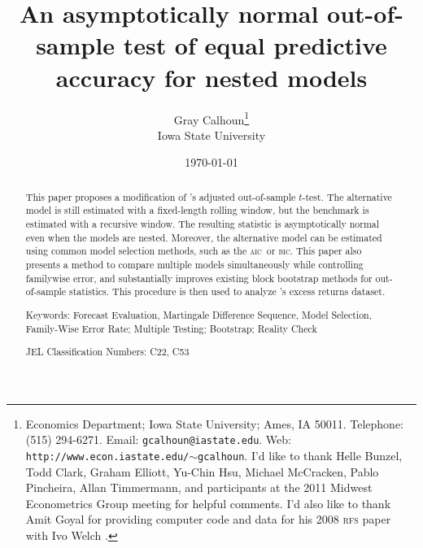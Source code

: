 \documentclass[12pt,fleqn]{article}
\newcommand\citepos[2][]{\citeauthor{#2}'s \citeyearpar[#1]{#2}}
\theoremstyle{definition}
\newcommand{\aic}{\textsc{aic}}
\newcommand{\bic}{\textsc{bic}}
\begin{document}
\author{Gray Calhoun\thanks{ Economics Department; Iowa State
    University; Ames, IA 50011.  Telephone: (515) 294-6271.  Email:
    \texttt{gcalhoun@iastate.edu}.  Web:
    \texttt{http://www.econ.iastate.edu/$\sim$gcalhoun}.  I'd like to
    thank Helle Bunzel, Todd Clark, Graham Elliott, Yu-Chin Hsu,
    Michael McCracken, Pablo Pincheira, Allan Timmermann, and
    participants at the 2011 Midwest Econometrics Group meeting for
    helpful comments.  I'd also like to thank Amit Goyal for providing
    computer code and data for his 2008 \textsc{rfs} paper with Ivo
    Welch \citep{GoW:08}.} \\
  Iowa State University}

\title{An asymptotically normal out-of-sample
  test of equal predictive accuracy for nested models} \date{\today}
\maketitle

\begin{abstract} 
  \noindent This paper proposes a modification of \citepos[\textit{J.
    Econom.}]{ClW:07} adjusted out-of-sample $t$-test.  The
  alternative model is still estimated with a fixed-length rolling
  window, but the benchmark is estimated with a recursive window. The
  resulting statistic is asymptotically normal even when the models
  are nested.  Moreover, the alternative model can be estimated using
  common model selection methods, such as the \aic\ or \bic.  This
  paper also presents a method to compare multiple models
  simultaneously while controlling familywise error, and
  substantially improves existing block bootstrap methods for
  out-of-sample statistics.  This procedure is then used to analyze
  \citepos[\textit{Rev. Finan. Stud.}]{GoW:08} excess returns dataset.

\strut

\noindent Keywords: Forecast Evaluation, Martingale Difference
Sequence, Model Selection, Family-Wise Error Rate; Multiple Testing;
Bootstrap; Reality Check

\strut

\noindent JEL Classification Numbers: C22, C53

\end{abstract}
\end{document}
